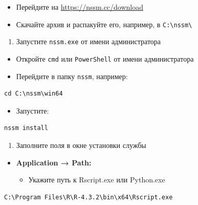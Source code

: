 \documentclass[
]{book}
\providecommand{\tightlist}{%
  \setlength{\itemsep}{0pt}\setlength{\parskip}{0pt}}
\begin{document}
\begin{itemize}
\tightlist
\item
  Перейдите на \url{https://nssm.cc/download}
\item
  Скачайте архив и распакуйте его, например, в \texttt{C:\textbackslash{}nssm\textbackslash{}}
\end{itemize}

\begin{enumerate}
\def\labelenumi{\arabic{enumi}.}
\setcounter{enumi}{1}
\tightlist
\item
  Запустите \texttt{nssm.exe} от имени администратора
\end{enumerate}

\begin{itemize}
\tightlist
\item
  Откройте \texttt{cmd} или \texttt{PowerShell} от имени администратора
\item
  Перейдите в папку \texttt{nssm}, например:
\end{itemize}

\begin{verbatim}
cd C:\nssm\win64
\end{verbatim}

\begin{itemize}
\tightlist
\item
  Запустите:
\end{itemize}

\begin{verbatim}
nssm install
\end{verbatim}

\begin{enumerate}
\def\labelenumi{\arabic{enumi}.}
\setcounter{enumi}{2}
\tightlist
\item
  Заполните поля в окне установки службы
\end{enumerate}

\begin{itemize}
\tightlist
\item
  \textbf{Application → Path:}

  \begin{itemize}
  \tightlist
  \item
    Укажите путь к Rscript.exe или Python.exe
  \end{itemize}
\end{itemize}

\begin{verbatim}
C:\Program Files\R\R-4.3.2\bin\x64\Rscript.exe
\end{verbatim}
\end{document}
